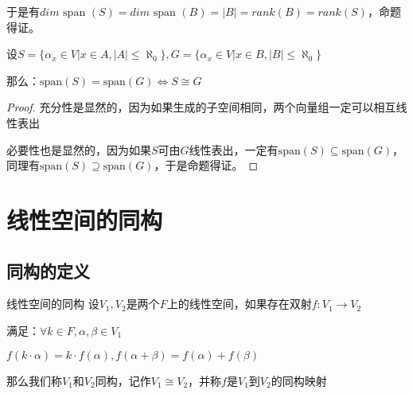 \documentclass[12pt, a4paper, oneside, UTF8]{ctexbook}
\begin{document}
\begin{para}{0}
\begin{proposition}
						于是有$dim \text{ span }(S)=dim \text{ span }(B)=|B|=rank(B)=rank(S)$，命题得证。
					\end{proposition}
				\point{}
					\begin{proposition}
						设$S=\{\alpha_x \in V| x \in A,|A| \leqslant \aleph_0\},G=\{\alpha_x \in V| x \in B,|B| \leqslant \aleph_0\}$

						那么：$\text{span}(S)=\text{span}(G) \Leftrightarrow S \cong G$
					\end{proposition}
					\begin{proof}
						充分性是显然的，因为如果生成的子空间相同，两个向量组一定可以相互线性表出

						必要性也是显然的，因为如果$S$可由$G$线性表出，一定有$\text{span}(S)\subseteq\text{span}(G)$，同理有$\text{span}(S)\supseteq\text{span}(G)$，于是命题得证。
					\end{proof}
			\end{para}
	\section{线性空间的同构}
		\subsection{同构的定义}
			\begin{defn}{线性空间的同构}
				设$V_1,V_2$是两个$F$上的线性空间，如果存在双射$f:V_1 \rightarrow V_2$

				满足：$\forall k \in F,\alpha ,\beta \in V_1$

				$f(k\cdot\alpha )=k\cdot f(\alpha ),f(\alpha+\beta )=f(\alpha )+f(\beta )$

				那么我们称$V_1$和$V_2$同构，记作$V_1 \cong V_2$，并称$f$是$V_1$到$V_2$的同构映射
			\end{defn}
\end{document}
